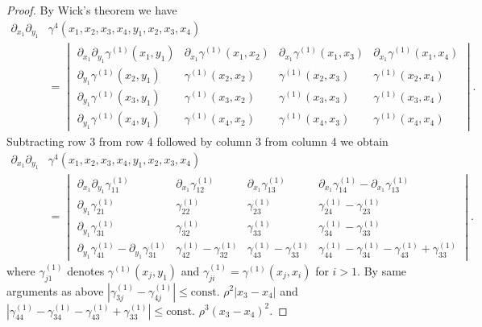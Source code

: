 \documentclass[a4paper,11pt]{article}
\newcommand{\abs}[1]{\left\lvert #1 \right\rvert}
\numberwithin{equation}{section}
\begin{document}
		\begin{proof}
			By Wick's theorem we have \begin{equation}
			\begin{aligned}
			\partial_{x_1}\partial_{y_1}&\gamma^{4}(x_1,x_2,x_3,x_4,y_1,x_2,x_3,x_4)\\&=\begin{vmatrix}
			\partial_{x_1}\partial_{y_1}\gamma^{(1)}(x_1,y_1)&\partial_{x_1}\gamma^{(1)}(x_1,x_2)&\partial_{x_1}\gamma^{(1)}(x_1,x_3)&\partial_{x_1}\gamma^{(1)}(x_1,x_4)\\
			\partial_{y_1}\gamma^{(1)}(x_2,y_1)&\gamma^{(1)}(x_2,x_2)&\gamma^{(1)}(x_2,x_3)&\gamma^{(1)}(x_2,x_4)\\
			\partial_{y_1}\gamma^{(1)}(x_3,y_1)&\gamma^{(1)}(x_3,x_2)&\gamma^{(1)}(x_3,x_3)&\gamma^{(1)}(x_3,x_4)\\
			\partial_{y_1}\gamma^{(1)}(x_4,y_1)&\gamma^{(1)}(x_4,x_2)&\gamma^{(1)}(x_4,x_3)&\gamma^{(1)}(x_4,x_4)
			\end{vmatrix}.
			\end{aligned}
			\end{equation}
			Subtracting row 3 from row 4 followed by column 3 from column 4 we obtain \begin{equation}
			\begin{aligned}
			\partial_{x_1}\partial_{y_1}&\gamma^{4}(x_1,x_2,x_3,x_4,y_1,x_2,x_3,x_4)\\&=\begin{vmatrix}
			\partial_{x_1}\partial_{y_1}\gamma^{(1)}_{11}&\partial_{x_1}\gamma^{(1)}_{12}&\partial_{x_1}\gamma^{(1)}_{13}&\partial_{x_1}\gamma^{(1)}_{14}-\partial_{x_1}\gamma^{(1)}_{13}\\
			\partial_{y_1}\gamma^{(1)}_{21}&\gamma^{(1)}_{22}&\gamma^{(1)}_{23}&\gamma^{(1)}_{24}-\gamma^{(1)}_{23}\\
			\partial_{y_1}\gamma^{(1)}_{31}&\gamma^{(1)}_{32}&\gamma^{(1)}_{33}&\gamma^{(1)}_{34}-\gamma^{(1)}_{33}\\
			\partial_{y_1}\gamma^{(1)}_{41}-\partial_{y_1}\gamma^{(1)}_{31}&\gamma^{(1)}_{42}-\gamma^{(1)}_{32}&\gamma^{(1)}_{43}-\gamma^{(1)}_{33}&\gamma^{(1)}_{44}-\gamma^{(1)}_{34}-\gamma^{(1)}_{43}+\gamma^{(1)}_{33}
			\end{vmatrix}.
			\end{aligned}
			\end{equation}
			where $ \gamma^{(1)}_{j1} $ denotes $ \gamma^{(1)}(x_j,y_1) $ and $ \gamma^{(1)}_{ji}=\gamma^{(1)}(x_j,x_i) $ for $ i>1 $. By same arguments as above $ \abs{\gamma^{(1)}_{3j}-\gamma^{(1)}_{4j}}\leq \text{const. }\rho^2\abs{x_3-x_4} $ and $ \abs{\gamma^{(1)}_{44}-\gamma^{(1)}_{34}-\gamma^{(1)}_{43}+\gamma^{(1)}_{33}}\leq \text{const. }\rho^3(x_3-x_4)^2 $.

\end{proof}
\end{document}

